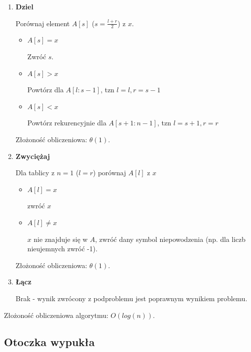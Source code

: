\documentclass[12pt]{article}
\begin{document}
        \begin{enumerate}
            \item \textbf{Dziel}
                
                Porównaj element $A[s]$ ($s = \frac{l+ r}{2}$) z $x$.
                
                \begin{itemize}
                    \item $A[s] = x$ 

                        Zwróć $s$.

                    \item $A[s] > x$

                        Powtórz dla $A[l : s - 1]$, tzn $l = l, r = s - 1$ 

                    \item $A[s] < x$

                        Powtórz rekurencyjnie dla $A[s + 1 : n - 1]$, tzn $l = s + 1, r = r$
                \end{itemize}

                Złożoność obliczeniowa: $\theta(1)$.
            
            \item \textbf{Zwyciężaj}

                Dla tablicy z $n = 1$ ($l = r$) porównaj $A[l]$ z $x$

                \begin{itemize}
                    \item $A[l] = x$

                        zwróć $x$
                    \item $A[l] \neq x$

                        $x$ nie znajduje się w $A$, zwróć dany symbol
                        niepowodzenia (np. dla liczb nieujemnych zwróć -1).
                \end{itemize}

                Złożoność obliczeniowa: $\theta(1)$.

            \item \textbf{Łącz}

                Brak - wynik zwrócony z podproblemu jest poprawnym wynikiem problemu.
        \end{enumerate}
        
        Złożoność obliczeniowa algorytmu: $O(log(n))$.
        
        \subsection{Otoczka wypukła}
\end{document}
